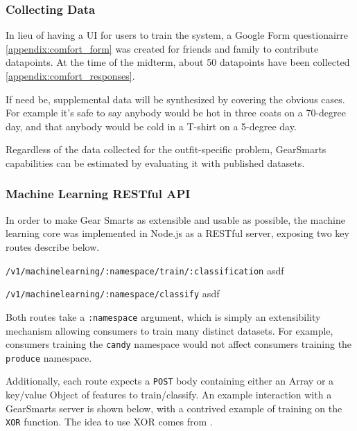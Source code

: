 \subsubsection{Collecting Data}
In lieu of having a UI for users to train the system, a Google Form questionairre \ref{appendix:comfort_form} was created for
friends and family to contribute datapoints. At the time of the midterm, about 50 datapoints have been collected
\ref{appendix:comfort_responses}.

If need be, supplemental data will be synthesized by covering the obvious cases. For example it's safe to say anybody
would be hot in three coats on a 70-degree day, and that anybody would be cold in a T-shirt on a 5-degree day.

Regardless of the data collected for the outfit-specific problem, GearSmarts capabilities can be estimated by evaluating
it with published datasets.

\subsubsection{Machine Learning RESTful API}
\label{subsction:mlapi}
In order to make Gear Smarts as extensible and usable as possible, the machine learning core was implemented in Node.js
as a RESTful server, exposing two key routes describe below.

\begin{description}
    \item{\texttt{/v1/machinelearning/:namespace/train/:classification}} asdf
    \item{\texttt{/v1/machinelearning/:namespace/classify}} asdf
\end{description}

Both routes take a \texttt{:namespace} argument, which is simply an extensibility mechanism allowing consumers to train
many distinct datasets. For example, consumers training the \texttt{candy} namespace would not affect consumers training
the \texttt{produce} namespace.

Additionally, each route expects a \texttt{POST} body containing either an Array or a key/value Object of features to
train/classify. An example interaction with a GearSmarts server is shown below, with a contrived example of training
on the \texttt{XOR} function. The idea to use XOR comes from \cite{Github:nodesvm}.

